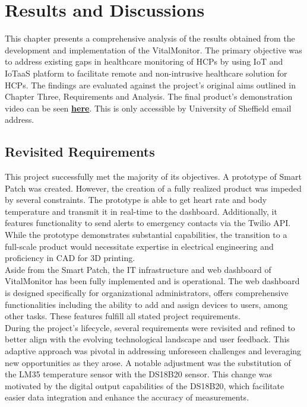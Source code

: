 \chapter{Results and Discussions}

This chapter presents a comprehensive analysis of the results obtained from the development and implementation of the VitalMonitor. The primary objective was to address existing gaps in healthcare monitoring of HCPs by using IoT and IoTaaS platform to facilitate remote and non-intrusive healthcare solution for HCPs. The findings are evaluated against the project's original aims outlined in Chapter Three, Requirements and Analysis. The final product's demonstration video can be seen \textbf{\href{https://drive.google.com/drive/folders/1X789dsolYtEVA_wNI7RSsXHxpvI9--Kl?usp=sharing}{here}}. This is only accessible by University of Sheffield email address. 

\section{Revisited Requirements}
This project successfully met the majority of its objectives. A prototype of Smart Patch was created. However, the creation of a fully realized product was impeded by several constraints. The prototype is able to get heart rate and body temperature and transmit it in real-time to the dashboard. Additionally, it features functionality to send alerts to emergency contacts via the Twilio API. While the prototype demonstrates substantial capabilities, the transition to a full-scale product would necessitate expertise in electrical engineering and proficiency in CAD for 3D printing. \\

\noindent Aside from the Smart Patch, the IT infrastructure and web dashboard of VitalMonitor has been fully implemented and is operational. The web dashboard is designed specifically for organizational administrators, offers comprehensive functionalities including the ability to add and assign devices to users, among other tasks. These features fulfill all stated project requirements. \\

\noindent During the project's lifecycle, several requirements were revisited and refined to better align with the evolving technological landscape and user feedback. This adaptive approach was pivotal in addressing unforeseen challenges and leveraging new opportunities as they arose. A notable adjustment was the substitution of the LM35 temperature sensor with the DS18B20 sensor. This change was motivated by the digital output capabilities of the DS18B20, which facilitate easier data integration and enhance the accuracy of measurements. \\
 
